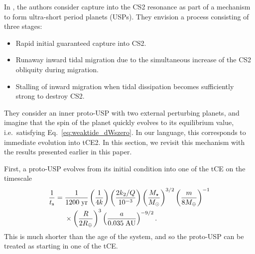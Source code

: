 \documentclass[
        fleqn,
        usenatbib,
    ]{mnras}
\newcommand*{\p}[1]{\left(#1\right)}
\begin{document}
In \citet{millholland2020formation}, the authors consider capture into the CS2
resonance as part of a mechanism to form ultra-short period planets (USPs). They
envision a process consisting of three stages:
\begin{itemize}
    \item Rapid initial guaranteed capture into CS2.

    \item Runaway inward tidal migration due to the simultaneous increase of the
        CS2 obliquity during migration.

    \item Stalling of inward migration when tidal dissipation becomes
        sufficiently strong to destroy CS2.
\end{itemize}
They consider an inner proto-USP with two external perturbing planets, and
imagine that the spin of the planet quickly evolves to its equilibrium value,
i.e.\ satisfying Eq.~\eqref{eq:weaktide_dWszero}. In our language, this
corresponds to immediate evolution into tCE2. In this section, we revisit this
mechanism with the results presented earlier in this paper.

First, a proto-USP evolves from its initial condition into one of the tCE on the
timescale
\begin{align}
    \frac{1}{t_{\rm s}} ={}& \frac{1}{1200\;\mathrm{yr}}
            \p{\frac{1}{4k}}
            \p{\frac{2k_2/Q}{10^{-3}}}
            \p{\frac{M_\star}{M_{\odot}}}^{3/2}
            \p{\frac{m}{8 M_{\oplus}}}^{-1}\nonumber\\
        &\times \p{\frac{R}{2R_{\oplus}}}^3
            \p{\frac{a}{0.035\;\mathrm{AU}}}^{-9/2}.
\end{align}
This is much shorter than the age of the system, and so the proto-USP can be
treated as starting in one of the tCE\@.
\end{document}
